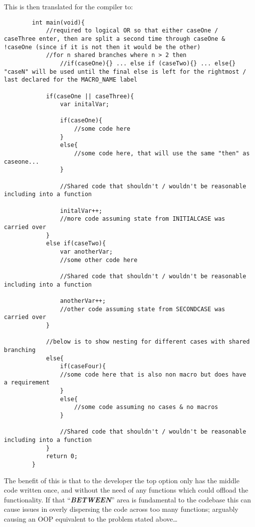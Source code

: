 \documentclass{article}
\newcommand{\textbfit}[1]{\textbf{\textit{#1}}}
\newcommand{\clfootnote}[3]{\color{#2}{\footnote{\label{#1}{ \color{#2}{#3}}}}\color{defaultcolor}}
\begin{document}
    \newpage
        This is then translated for the compiler to:

    \begin{lstlisting}
        int main(void){
            //required to logical OR so that either caseOne / caseThree enter, then are split a second time through caseOne & !caseOne (since if it is not then it would be the other)
            //for n shared branches where n > 2 then
                //if(caseOne){} ... else if (caseTwo){} ... else{} "caseN" will be used until the final else is left for the rightmost / last declared for the MACRO_NAME label
            
            if(caseOne || caseThree){
                var initalVar;

                if(caseOne){
                    //some code here
                }
                else{
                    //some code here, that will use the same "then" as caseone...
                }

                //Shared code that shouldn't / wouldn't be reasonable including into a function

                initalVar++;
                //more code assuming state from INITIALCASE was carried over
            }
            else if(caseTwo){
                var anotherVar;
                //some other code here

                //Shared code that shouldn't / wouldn't be reasonable including into a function

                anotherVar++;
                //other code assuming state from SECONDCASE was carried over
            }

            //below is to show nesting for different cases with shared branching
            else{
                if(caseFour){
                //some code here that is also non macro but does have a requirement
                }
                else{
                    //some code assuming no cases & no macros
                }

                //Shared code that shouldn't / wouldn't be reasonable including into a function
            }
            return 0;
        }
    \end{lstlisting}
    
        The benefit of this is that to the developer the top option only has the middle code written once, and without the need of any functions which could offload the functionality\clfootnote{HelperFuncNote}{blue}{Although helper functions in the case where they are truly non-fundamental \& ``off-loadable'' are fine}. If that ``\textbfit{BETWEEN}'' area is fundamental to the codebase this can cause issues in overly dispersing the code across too many functions; arguably causing an OOP equivalent to the problem stated above\dots
\end{document}
